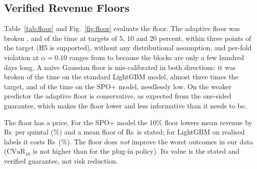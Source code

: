 \documentclass{ieeeaccess}
\newcommand{\Rs}{Rs\,}
\begin{document}
\begin{table}[!t]
\caption{Does Network Silence Add Information? Untuned LightGBM, by Outer Fold}
\label{tab:silence}
\centering
\setlength{\tabcolsep}{3pt}
\resizebox{\columnwidth}{!}{}
\par\vspace{2pt}{\footnotesize AUC for ``will this yard report on the sale day'', averaged over four holds; MAE of the next-day log-return at yards that report.\par}
\end{table}

\subsection{Verified Revenue Floors}
\label{sec:resfloor}
Table~\ref{tab:floor} and Fig.~\ref{fig:floor} evaluate the floor. The adaptive floor was broken \ViolFive{}, \ViolTen{} and \ViolTwenty{} of the time at targets of 5, 10 and 20 percent, within three points of the target (H5 is supported), without any distributional assumption, and per-fold violation at $\alpha=0.10$ ranges from \ViolFoldLo{} to \ViolFoldHi{} because the blocks are only a few hundred days long. A naive Gaussian floor is mis-calibrated in both directions: it was broken \ViolNaiveObs{} of the time on the standard LightGBM model, almost three times the target, and \ViolNaiveG{} of the time on the SPO+ model, needlessly low. On the weaker predictor the adaptive floor is conservative, as expected from the one-sided guarantee, which makes the floor lower and less informative than it needs to be.

The floor has a price. For the SPO+ model the 10\% floor lowers mean revenue by \Rs\FloorCost{} per quintal (\FloorCostPct{}\%) and a mean floor of \Rs\MeanFloor{} is stated; for LightGBM on realised labels it costs \Rs\FloorCostLgbm{} (\FloorCostLgbmPct{}\%). The floor does \emph{not} improve the worst outcomes in our data ($\mathrm{CVaR}_{10}$ is not higher than for the plug-in policy). Its value is the stated and verified guarantee, not risk reduction.

\begin{table}[!t]
\caption{Revenue Floors on Tomato: Violation Rate, Mean Floor, Revenue and CVaR$_{10}$ (Rs per Quintal)}
\label{tab:floor}
\centering
\setlength{\tabcolsep}{4pt}
\resizebox{0.78\textwidth}{!}{}
\par{}
\end{table}
\end{document}
